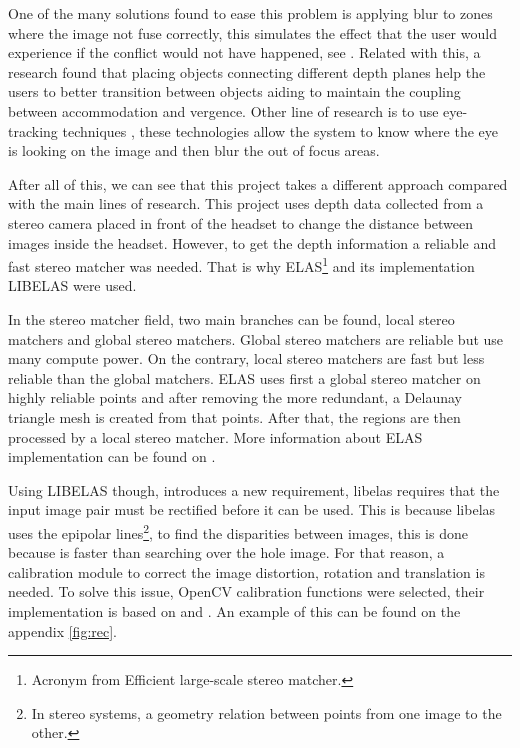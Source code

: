 \documentclass[10pt,a4paper,twocolumn,twoside]{article}
\begin{document}
	One of the many solutions found to ease this problem is applying blur to zones where the image not fuse correctly, this simulates the effect that the user would experience if the conflict would not have happened, see \cite{neareyeblur}. Related with this, a research \cite{sceneComposition} found that placing objects connecting different depth planes help the users to better transition between objects aiding to maintain the coupling between accommodation and vergence. Other line of research is to use eye-tracking techniques \cite{eyeTracking}, these technologies allow the system to know where the eye is looking on the image and then blur the out of focus areas. 
	
	After all of this, we can see that this project takes a different approach compared with the main lines of research.  This project uses depth data collected from a stereo camera placed in front of the headset to change the distance between images inside the headset. However, to get the depth information a reliable and fast stereo matcher was needed. That is why ELAS\footnote{Acronym from Efficient large-scale stereo matcher.} \cite{LIBELAS} and its implementation LIBELAS were used.
		
	In the stereo matcher field, two main branches can be found, local stereo matchers and global stereo matchers. Global stereo matchers are reliable but use many compute power. On the contrary, local stereo matchers are fast but less reliable than the global matchers. ELAS uses first a global stereo matcher on highly reliable points and after removing the more redundant, a Delaunay triangle mesh is created from that points. After that, the regions are then processed by a local stereo matcher. More information about ELAS implementation can be found on \cite{LIBELAS}. 
	
	Using LIBELAS though, introduces a new requirement, libelas requires that the input image pair must be rectified before it can be used. This is because libelas uses the epipolar lines\footnote{In stereo systems, a geometry relation between points from one image to the other. }, to find the disparities between images, this is done because is faster than searching over the hole image. For that reason, a calibration module to correct the image distortion, rotation and translation is needed. To solve this issue, OpenCV calibration functions were selected, their implementation is based on \cite{bouguetcalibration} and \cite{calibrationopencv2}. An example of this can be found on the appendix \ref{fig:rec}.
\end{document}
